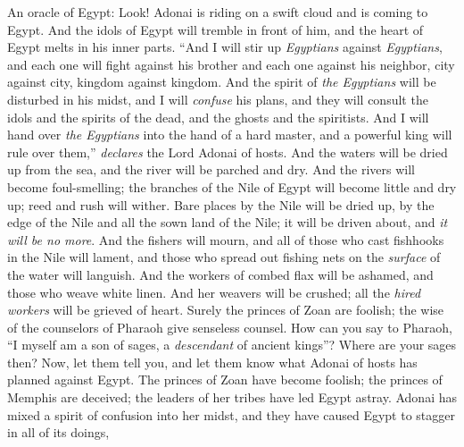 \begin{biblechapter} %
 An oracle of Egypt:
\verse Look! Adonai is riding on a swift cloud 
and is coming to Egypt. 
And the idols of Egypt will tremble in front of him, 
and the heart of Egypt melts in his inner parts.
\verse “And I will stir up \textit{Egyptians} against \textit{Egyptians}, 
and each one will fight against his brother 
and each one against his neighbor, 
city against city, kingdom against kingdom.
\verse And the spirit of \textit{the Egyptians} will be disturbed in his midst, 
and I will \textit{confuse} his plans, 
and they will consult the idols and the spirits of the dead, 
and the ghosts and the spiritists.
\verse And I will hand over \textit{the Egyptians} into the hand of a hard master, 
and a powerful king will rule over them,” 
\textit{declares} the Lord Adonai of hosts.
\verse And the waters will be dried up from the sea, 
and the river will be parched and dry.
\verse And the rivers will become foul-smelling; 
the branches of the Nile of Egypt will become little and dry up; 
reed and rush will wither.
\verse Bare places by the Nile will be dried up, 
by the edge of the Nile and all the sown land of the Nile; 
it will be driven about, and \textit{it will be no more}.
\verse And the fishers will mourn, 
and all of those who cast fishhooks in the Nile will lament, 
and those who spread out fishing nets on the \textit{surface} of the water will languish.
\verse And the workers of combed flax will be ashamed, 
and those who weave white linen.
\verse And her weavers will be crushed; 
all the \textit{hired workers} will be grieved of heart.
\verse Surely the princes of Zoan are foolish; 
the wise of the counselors of Pharaoh give senseless counsel. 
How can you say to Pharaoh, 
“I myself am a son of sages, 
a \textit{descendant} of ancient kings”?
\verse Where are your sages then? 
Now, let them tell you, 
and let them know what Adonai of hosts has planned against Egypt.
\verse The princes of Zoan have become foolish; 
the princes of Memphis are deceived; 
the leaders of her tribes have led Egypt astray.
\verse Adonai has mixed a spirit of confusion into her midst, 
and they have caused Egypt to stagger in all of its doings, 

\end{biblechapter}
